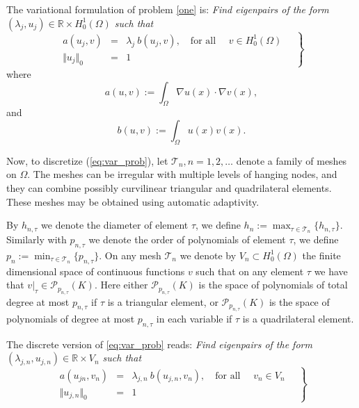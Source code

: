 \documentclass[preprint,12pt]{elsarticle}
\newcommand{\cT}{\mathcal{T}}
\begin{document}
The variational formulation of problem \eqref{one} is:
\emph{Find eigenpairs of the form $(\lambda_j,u_j)\in
\mathbb{R}\times H^1_0(\Omega)$
such that}
\begin{equation}
\label{eq:var_prob}
\left.
\begin{array}{lcl}
a(u_j,v)&=& \lambda_j\ b(u_j,v),
\quad \text{for all } \quad v  \in H^1_0(\Omega)\\
 \Vert u_j \Vert_{0} &=& 1
\end{array}\quad
\right\}
\end{equation}
where
\begin{equation}\label{eq:a}
a(u,v):=\int_\Omega \nabla u(x)\cdot \nabla v(x),
\end{equation}
and
\begin{equation}\label{eq:b}
b(u,v):=\int_\Omega u(x) v(x).
\end{equation}

Now, to discretize (\ref{eq:var_prob}), let $\cT_n, n =
1,2,\ldots $ denote a family of meshes on $\Omega$.
The meshes can be irregular with multiple levels of hanging nodes, 
and they can combine possibly curvilinear triangular and quadrilateral 
elements. These meshes may be obtained using automatic adaptivity. 

By $h_{n,\tau}$ we denote the diameter of element $\tau$,  
we define
$
h_n:=\max_{\tau\in \mathcal{T}_n}\{h_{n,\tau}\}.
$
Similarly with  $p_{n,\tau}$ we denote  the order of polynomials of element $\tau$,  
we define
$
p_n:=\min_{\tau\in \mathcal{T}_n}\{p_{n,\tau}\}.
$
On any mesh $\mathcal{T}_n$ we denote by $V_n \subset H^1_0(\Omega)$ the finite
dimensional space of continuous functions $v$ such that on any element $\tau$ we 
have that $v|_\tau\in \mathcal{P}_{p_{n,\tau}}(K)$. Here either $\mathcal{P}_{p_{n,\tau}}(K)$ 
is the space of polynomials of total degree at most $p_{n,\tau}$ if $\tau$ is a triangular 
element, or $\mathcal{P}_{p_{n,\tau}}(K)$ is the space of polynomials of degree at most 
$p_{n,\tau}$ in each variable if $\tau$ is a quadrilateral element.



The discrete version of \eqref{eq:var_prob} reads:
\emph{Find eigenpairs of the form $(\lambda_{j,n},u_{j,n})\in
\mathbb{R}\times V_n$
such that}
\begin{equation}
\label{eq:disc_prob}
\left.
\begin{array}{lcl}
a(u_{jn},v_{n})&=& \lambda_{j,n}\ b(u_{j,n},v_{n}),
\quad \text{for all } \quad v_{n}  \in V_n\\
 \Vert u_{j,n} \Vert_{0} &=& 1
\end{array}\quad
\right\}
\end{equation}
\end{document}
